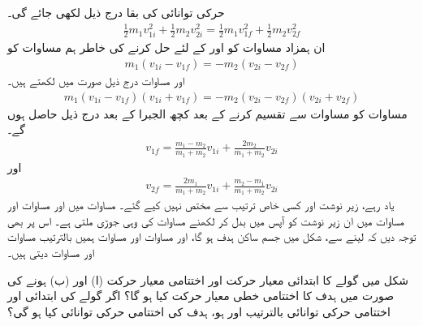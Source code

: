 حرکی توانائی کی بقا درج ذیل لکھی جائے گی۔
\begin{align}\label{مساوات_تصادم_حرکی_توانائی_کی_بقا}
\frac{1}{2}m_1v_{1i}^2+\frac{1}{2}m_2v_{2i}^2=\frac{1}{2}m_1v_{1f}^2+\frac{1}{2}m_2v_{2f}^2
\end{align}
ان ہمزاد  مساوات کو  اور  کے لئے حل کرنے کی خاطر  ہم مساوات  کو
\begin{align}\label{مساوات_تصادم_بقا_معار_دوم}
m_1(v_{1i}-v_{1f})=-m_2(v_{2i}-v_{2f})
\end{align}
اور مساوات  درج ذیل صورت میں لکھتے ہیں۔
\begin{align}\label{مساوات_تصادم_بقا_دوم}
m_1(v_{1i}-v_{1f})(v_{1i}+v_{1f})=-m_2(v_{2i}-v_{2f})(v_{2i}+v_{2f})
\end{align}
مساوات  کو مساوات  سے تقسیم کرنے  کے بعد کچھ الجبرا کے بعد درج ذیل حاصل ہوں گے۔
\begin{align}\label{مساوات_تصادم_اختتامی_الف}
v_{1f}=\frac{m_1-m_2}{m_1+m_2}v_{1i}+\frac{2m_2}{m_1+m_2}v_{2i}
\end{align}
اور
\begin{align}\label{مساوات_تصادم_اختتامی_ب}
v_{2f}=\frac{2m_1}{m_1+m_2}v_{1i}+\frac{m_2-m_1}{m_1+m_2}v_{2i}
\end{align}
یاد رہے، زیر نوشت  اور  کسی خاص ترتیب سے مختص نہیں کیے گئے۔  مساوات  میں  اور مساوات  اور مساوات   میں  ان زیر نوشت کو آپس میں بدل کر لکھنے  مساوات کی وہی جوڑی ملتی ہے۔ اس پر بھی توجہ دیں کہ   لینے سے، شکل  میں جسم  ساکن ہدف ہو گا، اور مساوات   اور مساوات  ہمیں  بالترتیب مساوات  اور مساوات  دیتی ہیں۔ 



شکل  میں گولے کا ابتدائی معیار حرکت  اور اختتامی معیار حرکت (ا)   اور (ب)  ہونے کی صورت میں   ہدف کا  اختتامی خطی معیار حرکت کیا ہو گا؟ اگر گولے کی  ابتدائی اور  اختتامی حرکی توانائی بالترتیب   اور  ہو، ہدف کی اختتامی حرکی توانائی کیا ہو گی؟

